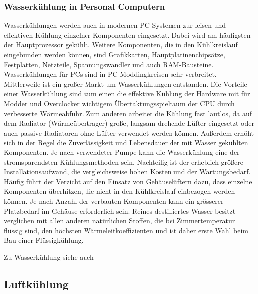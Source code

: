 \subsubsection{Wasserkühlung in Personal Computern}

Wasserkühlungen werden auch in modernen PC-Systemen zur leisen und effektiven Kühlung einzelner Komponenten eingesetzt. Dabei wird am häufigsten der Hauptprozessor gekühlt. Weitere Komponenten, die in den Kühlkreislauf eingebunden werden können, sind Grafikkarten, Hauptplatinen­chipsätze, Festplatten, Netzteile, Spannungswandler und auch RAM-Bausteine.
Wasserkühlungen für PCs sind in PC-Moddingkreisen sehr verbreitet. Mittlerweile ist ein großer Markt um Wasserkühlungen entstanden.
Die Vorteile einer Wasserkühlung sind zum einen die effektive Kühlung der Hardware mit für Modder und Overclocker wichtigem Übertaktungsspielraum der CPU durch verbesserte Wärmeabfuhr. Zum anderen arbeitet die Kühlung fast lautlos, da auf dem Radiator (Wärmeübertrager) große, langsam drehende Lüfter eingesetzt oder auch passive Radiatoren ohne Lüfter verwendet werden können. Außerdem erhöht sich in der Regel die Zuverlässigkeit und Lebensdauer der mit Wasser gekühlten Komponenten. Je nach verwendeter Pumpe kann die Wasserkühlung eine der stromsparendsten Kühlungsmethoden sein.
Nachteilig ist der erheblich größere Installationsaufwand, die vergleichsweise hohen Kosten und der Wartungsbedarf. Häufig führt der Verzicht auf den Einsatz von Gehäuselüftern dazu, dass einzelne Komponenten überhitzen, die nicht in den Kühlkreislauf einbezogen werden können. Je nach Anzahl der verbauten Komponenten kann ein grösserer Platzbedarf im Gehäuse erforderlich sein.
Reines destilliertes Wasser besitzt verglichen mit allen anderen natürlichen Stoffen, die bei Zimmertemperatur flüssig sind, den höchsten Wärmeleitkoeffizienten und ist daher erste Wahl beim Bau einer Flüssigkühlung.

Zu Wasserkühlung siehe auch \cite{Wasserkuehlung}

\newpage

\subsection{Luftkühlung} 

